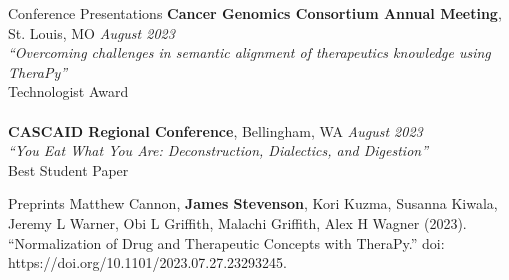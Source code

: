 \documentclass{cv} %
\begin{document}

\begin{rSection}{Conference Presentations}
{\bf Cancer Genomics Consortium Annual Meeting}{, St. Louis, MO} \hfill {\em August 2023}\\
{\em ``Overcoming challenges in semantic alignment of therapeutics knowledge using TheraPy''}\\
{Technologist Award}\\
\\
{\bf CASCAID Regional Conference}{, Bellingham, WA} \hfill {\em August 2023}\\
{\em ``You Eat What You Are: Deconstruction, Dialectics, and Digestion''}\\
{Best Student Paper}

\end{rSection}


\begin{rSection}{Preprints}
{Matthew Cannon, \textbf{James Stevenson}, Kori Kuzma, Susanna Kiwala, Jeremy L Warner, Obi L Griffith, Malachi Griffith, Alex H Wagner (2023). ``Normalization of Drug and Therapeutic Concepts with TheraPy.'' doi: https://doi.org/10.1101/2023.07.27.23293245.}
\\
\end{rSection}
\end{document}
